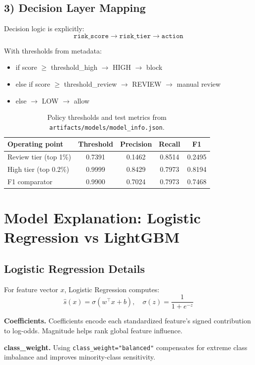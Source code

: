 \documentclass[11pt]{article}
\begin{document}
\subsection{3) Decision Layer Mapping}
Decision logic is explicitly:
\[
\texttt{risk\_score} \rightarrow \texttt{risk\_tier} \rightarrow \texttt{action}
\]

With thresholds from metadata:
\begin{itemize}
\item if score $\geq$ threshold\_high $\rightarrow$ HIGH $\rightarrow$ block
\item else if score $\geq$ threshold\_review $\rightarrow$ REVIEW $\rightarrow$ manual review
\item else $\rightarrow$ LOW $\rightarrow$ allow
\end{itemize}

\begin{table}[H]
\centering
\caption{Policy thresholds and test metrics from \texttt{artifacts/models/model\_info.json}.}
\begin{tabular}{lcccc}
\toprule
Operating point & Threshold & Precision & Recall & F1 \\
\midrule
Review tier (top 1\%) & 0.7391 & 0.1462 & 0.8514 & 0.2495 \\
High tier (top 0.2\%) & 0.9999 & 0.8429 & 0.7973 & 0.8194 \\
F1 comparator & 0.9900 & 0.7024 & 0.7973 & 0.7468 \\
\bottomrule
\end{tabular}
\end{table}

\section{Model Explanation: Logistic Regression vs LightGBM}

\subsection{Logistic Regression Details}
For feature vector $x$, Logistic Regression computes:
\[
\hat{s}(x)=\sigma(w^\top x + b), \quad \sigma(z)=\frac{1}{1+e^{-z}}
\]

\textbf{Coefficients.} Coefficients encode each standardized feature's signed contribution to log-odds. Magnitude helps rank global feature influence.

\textbf{class\_weight.} Using \texttt{class\_weight="balanced"} compensates for extreme class imbalance and improves minority-class sensitivity.
\end{document}
